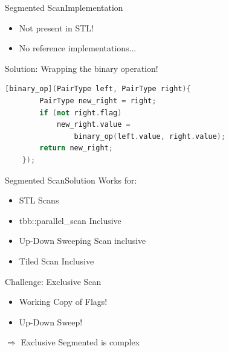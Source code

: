 \begin{frame}[fragile]{Segmented Scan}{Implementation}
    \begin{itemize}
     \item Not present in STL!
     \item No reference implementations...
    \end{itemize}
    \vspace{10pt}
    Solution: Wrapping the binary operation!
    
    
    \begin{lstlisting}[language=C++, frame=single, gobble=4]
    [binary_op](PairType left, PairType right){
        PairType new_right = right;
        if (not right.flag)
            new_right.value =
                binary_op(left.value, right.value);
        return new_right;
    });
    \end{lstlisting}
\end{frame} 
% 
% 


\begin{frame}[fragile]{Segmented Scan}{Solution}
Works for:
\begin{itemize}
 \item STL Scans
 \item tbb::parallel\_scan Inclusive
 \item Up-Down Sweeping Scan inclusive
 \item Tiled Scan Inclusive
\end{itemize}
\vspace{10pt}
Challenge: Exclusive Scan
\begin{itemize}
 \item Working Copy of Flags!
 \item Up-Down Sweep!
\end{itemize}
$\Rightarrow$ Exclusive Segmented is complex

\end{frame}


